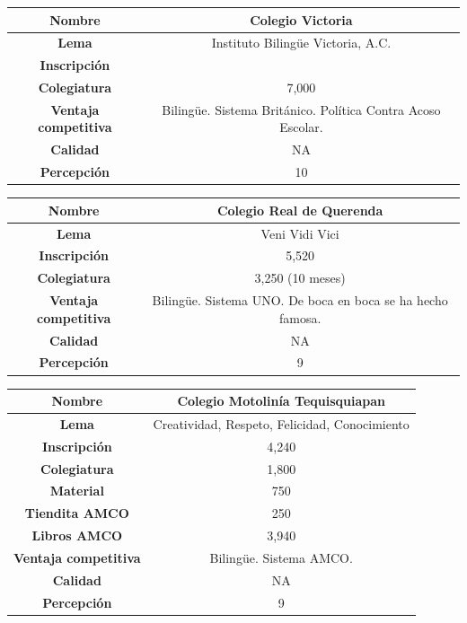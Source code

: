 \documentclass[10pt,letterpaper,oneside]{book}
\begin{document}
\begin{center}
\begin{tabular}{|c|c|}
\hline 
{\bf Nombre} & Colegio Victoria \\ 
\hline 
{\bf Lema} & Instituto Bilingüe Victoria, A.C. \\ 
\hline 
{\bf Inscripción} &  \\ 
\hline 
{\bf Colegiatura} & 7,000 \\ 
\hline
{\bf Ventaja competitiva} & Bilingüe. Sistema Británico. Política Contra Acoso Escolar. \\ 
\hline 
{\bf Calidad} & NA \\ 
\hline 
{\bf Percepción} & 10 \\ 
\hline 
\end{tabular} 
\end{center}

\begin{center}
\begin{tabular}{|c|c|}
\hline 
{\bf Nombre} & Colegio Real de Querenda \\ 
\hline 
{\bf Lema} & Veni Vidi Vici \\ 
\hline 
{\bf Inscripción} & 5,520 \\ 
\hline 
{\bf Colegiatura} & 3,250 (10 meses) \\
\hline
{\bf Ventaja competitiva} & Bilingüe. Sistema UNO. De boca en boca se ha hecho famosa. \\ 
\hline 
{\bf Calidad} & NA \\ 
\hline 
{\bf Percepción} & 9 \\ 
\hline 
\end{tabular} 
\end{center}

\begin{center}
\begin{tabular}{|c|c|}
\hline 
{\bf Nombre} & Colegio Motolinía Tequisquiapan \\ 
\hline 
{\bf Lema} & Creatividad, Respeto, Felicidad, Conocimiento \\ 
\hline 
{\bf Inscripción} & 4,240 \\ 
\hline 
{\bf Colegiatura} & 1,800 \\
\hline
{\bf Material} & 750 \\
\hline
{\bf Tiendita AMCO} & 250 \\
\hline
{\bf Libros AMCO} & 3,940 \\
\hline
{\bf Ventaja competitiva} & Bilingüe. Sistema AMCO.\\ 
\hline 
{\bf Calidad} & NA \\ 
\hline 
{\bf Percepción} & 9 \\ 
\hline 
\end{tabular} 
\end{center}
\end{document}
